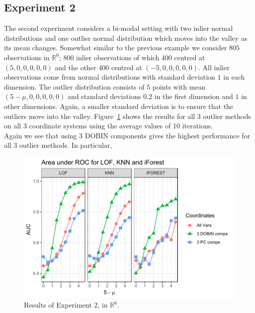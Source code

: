 \documentclass[11pt]{article}
\begin{document}
\subsection{Experiment 2}
The second experiment considers a bi-modal setting with two inlier normal distributions and one outlier normal  distribution which moves into the valley as its mean changes. Somewhat similar to the previous example we consider $805$ observations in $\mathbb{R}^6$; $800$ inlier observations of which $400$  centred at $(5,0,0,0,0,0)$ and the other $400$ centred at $(-5,0,0,0,0,0)$. All inlier observations come from normal distributions with standard deviation $1$ in each dimension. The outlier distribution consists of $5$ points with mean $(5-\mu,0,0,0,0,0)$ and standard deviations $0.2$ in the first dimension and $1$ in other dimensions. Again, a smaller standard deviation is to ensure that the outliers move into the valley. Figure~\ref{fig:Exp2} shows the results for all $3$  outlier methods on all $3$ coordinate systems using the average values of 10 iterations. \\

Again we see that using 3 DOBIN components gives the highest performance for all 3 outlier methods. In particular, 
\begin{figure}
	\centering
	\includegraphics[scale=0.8]{Exp2.pdf}
	\caption{Results of Experiment 2, in $\mathbb{R}^6$.}
	\label{fig:Exp2}
\end{figure} 
\end{document}
